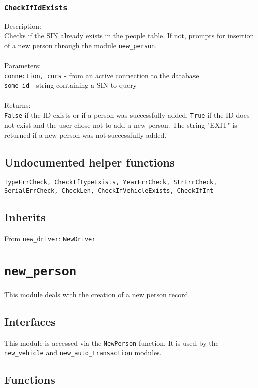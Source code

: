 \documentclass[12pt]{article}
\begin{document}
\subsubsection{\texttt{CheckIfIdExists}}
Description:\\
\indent Checks if the SIN already exists in the people table. If not, prompts for insertion of a new person through the module \texttt{new\_person}.\\\\
Parameters:\\
\indent\texttt{connection, curs} - from an active connection to the database\\
\indent \texttt{some\_id} - string containing a SIN to query\\\\
Returns:\\
\indent \texttt{False} if the ID exists or if a person was successfully added, \texttt{True} if the ID does not exist and the user chose not to add a new person. The string "EXIT" is returned if a new person was not successfully added.
\subsection{Undocumented helper functions}
\texttt{TypeErrCheck, CheckIfTypeExists, YearErrCheck, StrErrCheck, SerialErrCheck, CheckLen, CheckIfVehicleExists, CheckIfInt}
\subsection{Inherits}
From \texttt{new\_driver}: \texttt{NewDriver}

\newpage
\section{\texttt{new\_person}}
This module deals with the creation of a new person record.

\subsection{Interfaces}
This module is accessed via the \texttt{NewPerson} function. It is used by the \texttt{new\_vehicle} and \texttt{new\_auto\_transaction} modules.

\subsection{Functions}
\end{document}
